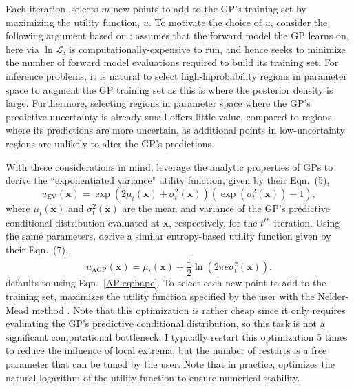 Each iteration, \approxposterior selects $m$ new points to add to the GP's training set by maximizing the utility function, $u$. To motivate the choice of $u$, consider the following argument based on \citet{Kandasamy2017}: \approxposterior assumes that the forward model the GP learns on, here \vplanet via $\ln \mathcal{L}$, is computationally-expensive to run, and hence \approxposterior seeks to minimize the number of forward model evaluations required to build its training set. For inference problems, it is natural to select high-lnprobability regions in parameter space to augment the GP training set as this is where the posterior density is large. Furthermore, selecting regions in parameter space where the GP's predictive uncertainty is already small offers little value, compared to regions where its predictions are more uncertain, as additional points in low-uncertainty regions are unlikely to alter the GP's predictions. 

With these considerations in mind, \citet{Kandasamy2017} leverage the analytic properties of GPs to derive the ``exponentiated variance" utility function, given by their Eqn.~(5),
\begin{equation} \label{AP:eq:bape}
    u_{\textrm{EV}}(\textbf{x}) = \exp(2 \mu_t(\textbf{x}) + \sigma_t^2(\textbf{x}))(\exp(\sigma_t^2(\textbf{x})) - 1),
\end{equation}
where $\mu_t(\textbf{x})$ and $\sigma_t^2(\textbf{x})$ are the mean and variance of the GP's predictive conditional distribution evaluated at \textbf{x}, respectively, for the $t^{th}$ \approxposterior iteration. Using the same parameters, \citet{Wang2018} derive a similar entropy-based utility function given by their Eqn.~(7),
\begin{equation} \label{AP:eq:agp}
    u_{\textrm{AGP}}(\textbf{x}) =\mu_t(\textbf{x}) + \frac{1}{2} \ln(2 \pi e \sigma_t^2(\textbf{x})).
\end{equation}
\approxposterior defaults to using Eqn.~\ref{AP:eq:bape}. To select each new point to add to the training set, \approxposterior maximizes the utility function specified by the user with the Nelder-Mead method \citep{Nelder1965}. Note that this optimization is rather cheap since it only requires evaluating the GP's predictive conditional distribution, so this task is not a significant computational bottleneck. I typically restart this optimization 5 times to reduce the influence of local extrema, but the number of restarts is a free parameter that can be tuned by the user.  Note that in practice, \approxposterior optimizes the natural logarithm of the utility function to ensure numerical stability.

